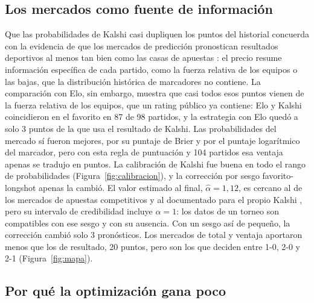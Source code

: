 \documentclass[12pt]{article}
\theoremstyle{plain}
\theoremstyle{remark}
\begin{document}
\subsection{Los mercados como fuente de información}

Que las probabilidades de Kalshi casi dupliquen los puntos del
historial concuerda con la evidencia de que los mercados de predicción
pronostican resultados deportivos al menos tan bien como las casas de
apuestas \citep{spann2009, forrest2005}: el precio resume información
específica de cada partido, como la fuerza relativa de los equipos o
las bajas, que la distribución histórica de marcadores no contiene.
La comparación con Elo, sin embargo, muestra que casi todos esos puntos
vienen de la fuerza relativa de los equipos, que un rating público ya
contiene: Elo y Kalshi coincidieron en el favorito en 87 de 98
partidos, y la estrategia con Elo quedó a solo 3 puntos de la que usa
el resultado de Kalshi.
Las probabilidades del mercado sí fueron mejores, por su puntaje de
Brier y por el puntaje logarítmico del marcador, pero con esta regla
de puntuación y 104 partidos esa ventaja apenas se tradujo en puntos.
La calibración de Kalshi fue buena en todo el rango de probabilidades
(Figura~\ref{fig:calibracion}), y la corrección por sesgo
favorito-longshot apenas la cambió.
El valor estimado al final, $\hat\alpha = 1{,}12$, es cercano al de
los mercados de apuestas competitivos \citep{whelan2024} y al
documentado para el propio Kalshi \citep{burgi2026}, pero su intervalo
de credibilidad incluye $\alpha = 1$: los datos de un torneo son
compatibles con ese sesgo y con su ausencia.
Con un sesgo así de pequeño, la corrección cambió solo 3 pronósticos.
Los mercados de total y ventaja aportaron menos que los de resultado,
20 puntos, pero son los que deciden entre 1-0, 2-0 y 2-1
(Figura~\ref{fig:mapa}).

\subsection{Por qué la optimización gana poco}
\end{document}
